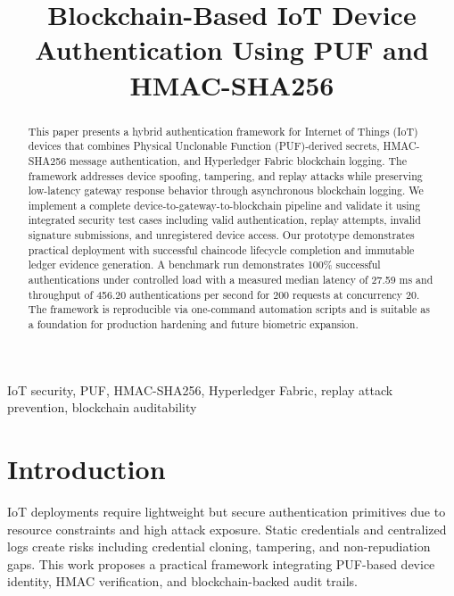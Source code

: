 \documentclass[conference]{IEEEtran}
\begin{document}
\title{Blockchain-Based IoT Device Authentication Using PUF and HMAC-SHA256}

\author{
}

\maketitle

\begin{abstract}
This paper presents a hybrid authentication framework for Internet of Things (IoT) devices that combines Physical Unclonable Function (PUF)-derived secrets, HMAC-SHA256 message authentication, and Hyperledger Fabric blockchain logging. The framework addresses device spoofing, tampering, and replay attacks while preserving low-latency gateway response behavior through asynchronous blockchain logging. We implement a complete device-to-gateway-to-blockchain pipeline and validate it using integrated security test cases including valid authentication, replay attempts, invalid signature submissions, and unregistered device access. Our prototype demonstrates practical deployment with successful chaincode lifecycle completion and immutable ledger evidence generation. A benchmark run demonstrates 100\% successful authentications under controlled load with a measured median latency of 27.59 ms and throughput of 456.20 authentications per second for 200 requests at concurrency 20. The framework is reproducible via one-command automation scripts and is suitable as a foundation for production hardening and future biometric expansion.
\end{abstract}

\begin{IEEEkeywords}
IoT security, PUF, HMAC-SHA256, Hyperledger Fabric, replay attack prevention, blockchain auditability
\end{IEEEkeywords}

\section{Introduction}
IoT deployments require lightweight but secure authentication primitives due to resource constraints and high attack exposure. Static credentials and centralized logs create risks including credential cloning, tampering, and non-repudiation gaps. This work proposes a practical framework integrating PUF-based device identity, HMAC verification, and blockchain-backed audit trails.
\end{document}
